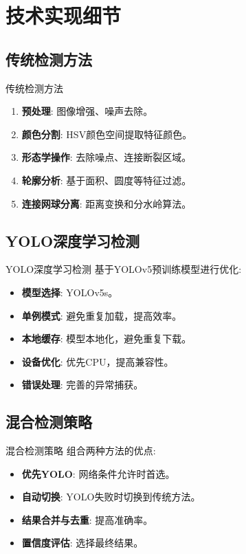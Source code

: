 \documentclass{beamer}
\begin{document}
\section{技术实现细节}
\subsection{传统检测方法}
\begin{frame}{传统检测方法}
    \begin{enumerate}
        \item \textbf{预处理}: 图像增强、噪声去除。
        \item \textbf{颜色分割}: HSV颜色空间提取特征颜色。
        \item \textbf{形态学操作}: 去除噪点、连接断裂区域。
        \item \textbf{轮廓分析}: 基于面积、圆度等特征过滤。
        \item \textbf{连接网球分离}: 距离变换和分水岭算法。
    \end{enumerate}
\end{frame}

\subsection{YOLO深度学习检测}
\begin{frame}{YOLO深度学习检测}
    基于YOLOv5预训练模型进行优化:
    \begin{itemize}
        \item \textbf{模型选择}: YOLOv5s。
        \item \textbf{单例模式}: 避免重复加载，提高效率。
        \item \textbf{本地缓存}: 模型本地化，避免重复下载。
        \item \textbf{设备优化}: 优先CPU，提高兼容性。
        \item \textbf{错误处理}: 完善的异常捕获。
    \end{itemize}
\end{frame}

\subsection{混合检测策略}
\begin{frame}{混合检测策略}
    组合两种方法的优点:
    \begin{itemize}
        \item \textbf{优先YOLO}: 网络条件允许时首选。
        \item \textbf{自动切换}: YOLO失败时切换到传统方法。
        \item \textbf{结果合并与去重}: 提高准确率。
        \item \textbf{置信度评估}: 选择最终结果。
    \end{itemize}
\end{frame}
\end{document}
